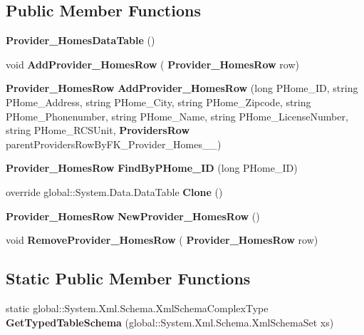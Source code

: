 \subsection*{Public Member Functions}
\begin{DoxyCompactItemize}
\item 
\textbf{ Provider\+\_\+\+Homes\+Data\+Table} ()
\item 
void \textbf{ Add\+Provider\+\_\+\+Homes\+Row} (\textbf{ Provider\+\_\+\+Homes\+Row} row)
\item 
\textbf{ Provider\+\_\+\+Homes\+Row} \textbf{ Add\+Provider\+\_\+\+Homes\+Row} (long P\+Home\+\_\+\+ID, string P\+Home\+\_\+\+Address, string P\+Home\+\_\+\+City, string P\+Home\+\_\+\+Zipcode, string P\+Home\+\_\+\+Phonenumber, string P\+Home\+\_\+\+Name, string P\+Home\+\_\+\+License\+Number, string P\+Home\+\_\+\+R\+C\+S\+Unit, \textbf{ Providers\+Row} parent\+Providers\+Row\+By\+F\+K\+\_\+\+Provider\+\_\+\+Homes\+\_\+\_)
\item 
\textbf{ Provider\+\_\+\+Homes\+Row} \textbf{ Find\+By\+P\+Home\+\_\+\+ID} (long P\+Home\+\_\+\+ID)
\item 
override global\+::\+System.\+Data.\+Data\+Table \textbf{ Clone} ()
\item 
\textbf{ Provider\+\_\+\+Homes\+Row} \textbf{ New\+Provider\+\_\+\+Homes\+Row} ()
\item 
void \textbf{ Remove\+Provider\+\_\+\+Homes\+Row} (\textbf{ Provider\+\_\+\+Homes\+Row} row)
\end{DoxyCompactItemize}
\subsection*{Static Public Member Functions}
\begin{DoxyCompactItemize}
\item 
static global\+::\+System.\+Xml.\+Schema.\+Xml\+Schema\+Complex\+Type \textbf{ Get\+Typed\+Table\+Schema} (global\+::\+System.\+Xml.\+Schema.\+Xml\+Schema\+Set xs)
\end{DoxyCompactItemize}
